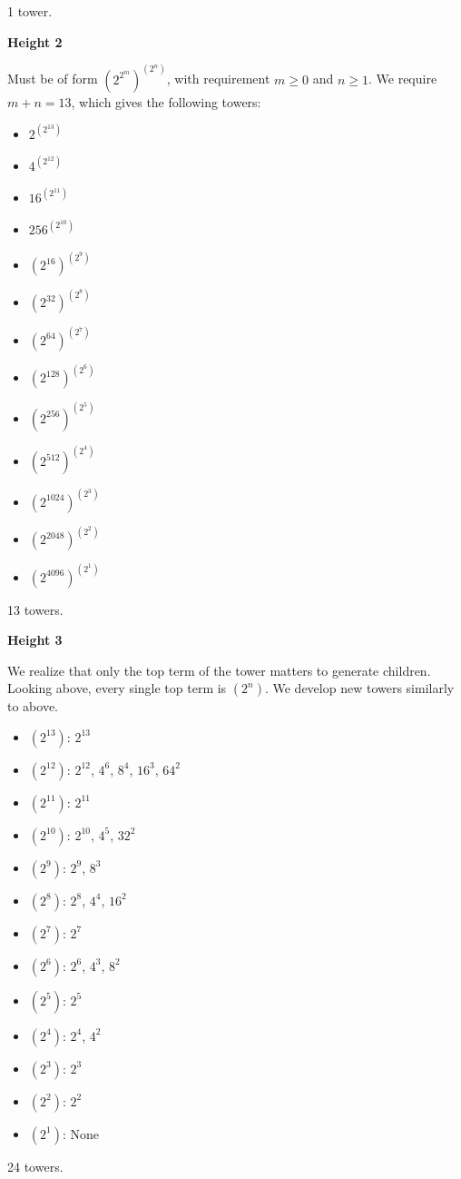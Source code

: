 \begin{enumerate}
 1 tower.

 
\textbf{Height 2}

 Must be of form $\left(2^{2^m}\right)^{(2^n)}$, with requirement $m\ge 0$ and $n\ge 1$. We require $m+n=13$, which gives the following towers:

 
            \begin{itemize}
        \item $2^{(2^{13})}$
        \item $4^{(2^{12})}$
        \item $16^{(2^{11})}$
        \item $256^{(2^{10})}$
        \item $(2^{16})^{(2^9)}$
        \item $(2^{32})^{(2^8)}$
        \item $(2^{64})^{(2^7)}$
        \item $(2^{128})^{(2^6)}$
        \item $(2^{256})^{(2^5)}$
        \item $(2^{512})^{(2^4)}$
        \item $(2^{1024})^{(2^3)}$
        \item $(2^{2048})^{(2^2)}$
        \item $(2^{4096})^{(2^1)}$
            \end{itemize}
            13 towers.

 
\textbf{Height 3}

 We realize that only the top term of the tower matters to generate children. Looking above, every single top term is $(2^n)$. We develop new towers similarly to above.

 
            \begin{itemize}
        \item $(2^{13})$: $2^{13}$
        \item $(2^{12})$: $2^{12}$, $4^{6}$, $8^{4}$, $16^{3}$, $64^{2}$
        \item $(2^{11})$: $2^{11}$
        \item $(2^{10})$: $2^{10}$, $4^{5}$, $32^{2}$
        \item $(2^{9})$: $2^{9}$, $8^{3}$
        \item $(2^{8})$: $2^{8}$, $4^{4}$, $16^{2}$
        \item $(2^{7})$: $2^{7}$
        \item $(2^{6})$: $2^{6}$, $4^{3}$, $8^{2}$
        \item $(2^{5})$: $2^{5}$
        \item $(2^{4})$: $2^{4}$, $4^{2}$
        \item $(2^{3})$: $2^{3}$
        \item $(2^{2})$: $2^{2}$
        \item $(2^{1})$: None
            \end{itemize}
            24 towers.


\end{enumerate}
